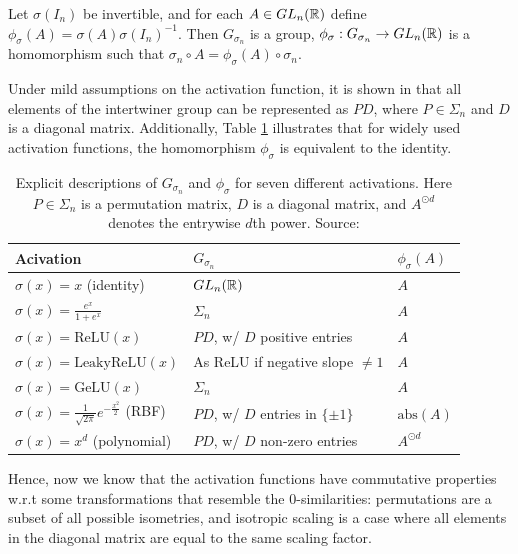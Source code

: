 \documentclass[../main.tex]{subfiles}
\begin{document}
\begin{lemma}
  \label{lem:intertwiner}
  Let $\sigma(I_n)$ be invertible, and for each $A \in GL_{n}(\mathbb{R})$ define $\phi_\sigma(A) = \sigma(A) \sigma(I_n)^{-1}$. Then $G_{\sigma_n}$ is a group, $\phi_\sigma: G_{\sigma_n} \to GL_{n}(\mathbb{R})$ is a homomorphism  such that $\sigma_n \circ A = \phi_{\sigma}(A) \circ \sigma_n$. 
\end{lemma}


Under mild assumptions on the activation function, it is shown in \cite{godfrey_symmetries_2023} that all elements of the intertwiner group can be represented as $PD$, where $P \in \Sigma_n$ and $D$ is a diagonal matrix. Additionally, Table \ref{tab:intertwiner-groups} illustrates that for widely used activation functions, the homomorphism $\phi_\sigma$ is equivalent to the identity. 

\begin{table}[ht]
\centering
\begin{tabular}[b]{lll}
\toprule
     Acivation &     $G_{\sigma_n}$ &     $\phi_\sigma(A)$ \\
\toprule

$\sigma(x) = x$ (identity) & $GL_n(\mathbb{R})$ & $A$\\
\midrule[.05pt]
$\sigma(x) = \frac{e^x}{1+e^x}$ & $\Sigma_n$ & $A$\\
\midrule[.05pt]
$\sigma(x) = \text{ReLU}(x)$ & $P D$, w/ $D$ positive entries & $A$\\
\midrule[.05pt]
$\sigma(x) = \text{LeakyReLU}(x)$ & As ReLU if negative slope $\neq 1$ & $A$ \\
\midrule[.05pt]
 $\sigma(x) = \text{GeLU}(x)$  & $\Sigma_n$ & $A$\\
 \midrule[.05pt]
$\sigma(x) = \frac{1}{\sqrt{2 \pi}} e^{-\frac{x^2}{2}}$ (RBF) & $P D$, w/ $D$ entries in $\{\pm 1\}$ & 
$\mathrm{abs}(A)$\\
\midrule[.05pt]
$\sigma(x) = x^d$ (polynomial) &  $P D$, w/ $D$ non-zero entries
& $A^{\odot  d}$
\end{tabular}
\caption{Explicit descriptions of $G_{\sigma_n}$ and $\phi_{\sigma}$ for seven different activations. Here $P \in \Sigma_n$ is a permutation matrix, $D$ is a diagonal matrix, and $A^{\odot d}$ denotes the entrywise $d$th power. Source: \cite{godfrey_symmetries_2023}}
\label{tab:intertwiner-groups} 
\end{table}

Hence, now we know that the activation functions have commutative properties w.r.t some transformations that resemble the $0$-similarities: permutations are a subset of all possible isometries, and isotropic scaling is a case where all elements in the diagonal matrix are equal to the same scaling factor.
\end{document}
